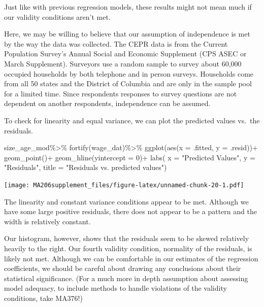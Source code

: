 \documentclass[
]{book}
\newenvironment{Shaded}{\begin{snugshade}}{\end{snugshade}}
\newcommand{\AttributeTok}[1]{\textcolor[rgb]{0.77,0.63,0.00}{#1}}
\newcommand{\DecValTok}[1]{\textcolor[rgb]{0.00,0.00,0.81}{#1}}
\newcommand{\FunctionTok}[1]{\textcolor[rgb]{0.00,0.00,0.00}{#1}}
\newcommand{\NormalTok}[1]{#1}
\newcommand{\SpecialCharTok}[1]{\textcolor[rgb]{0.00,0.00,0.00}{#1}}
\newcommand{\StringTok}[1]{\textcolor[rgb]{0.31,0.60,0.02}{#1}}
\begin{document}
Just like with previous regression models, these results might not mean much if our validity conditions aren't met.

Here, we may be willing to believe that our assumption of independence is met by the way the data was collected. The CEPR data is from the Current Population Survey's Annual Social and Economic Supplement (CPS ASEC or March Supplement). Surveyors use a random sample to survey about 60,000 occupied households by both telephone and in person surveys. Households come from all 50 states and the District of Columbia and are only in the sample pool for a limited time. Since respondents responses to survey questions are not dependent on another respondents, independence can be assumed.

To check for linearity and equal variance, we can plot the predicted values vs.~the residuals.

\begin{Shaded}
\begin{Highlighting}[]
\NormalTok{size\_age\_mod}\SpecialCharTok{\%\textgreater{}\%}
  \FunctionTok{fortify}\NormalTok{(wage\_dat)}\SpecialCharTok{\%\textgreater{}\%}
  \FunctionTok{ggplot}\NormalTok{(}\FunctionTok{aes}\NormalTok{(}\AttributeTok{x =}\NormalTok{ .fitted, }\AttributeTok{y =}\NormalTok{ .resid))}\SpecialCharTok{+}
  \FunctionTok{geom\_point}\NormalTok{()}\SpecialCharTok{+}
  \FunctionTok{geom\_hline}\NormalTok{(}\AttributeTok{yintercept =} \DecValTok{0}\NormalTok{)}\SpecialCharTok{+}
  \FunctionTok{labs}\NormalTok{( }\AttributeTok{x =} \StringTok{"Predicted Values"}\NormalTok{, }\AttributeTok{y =} \StringTok{"Residuals"}\NormalTok{, }\AttributeTok{title =} \StringTok{"Residuals vs. predicted values"}\NormalTok{)}
\end{Highlighting}
\end{Shaded}

\texttt{[image: MA206supplement\_files/figure-latex/unnamed-chunk-20-1.pdf]}

The linearity and constant variance conditions appear to be met. Although we have some large positive residuals, there does not appear to be a pattern and the width is relatively constant.

Our histogram, however, shows that the residuals seem to be skewed relatively heavily to the right. Our fourth validity condition, normality of the residuals, is likely not met. Although we can be comfortable in our estimates of the regression coefficients, we should be careful about drawing any conclusions about their statistical significance. (For a much more in depth assumption about assessing model adequacy, to include methods to handle violations of the validity conditions, take MA376!)
\end{document}
